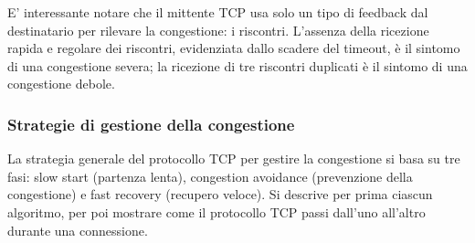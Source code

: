 E' interessante notare che il mittente TCP usa solo un tipo di feedback dal destinatario per rilevare la congestione: i riscontri. L'assenza della ricezione rapida e regolare dei riscontri, evidenziata dallo scadere del timeout, è il sintomo di una congestione severa; la ricezione di tre riscontri duplicati è il sintomo di una congestione debole.

\subsubsection{Strategie di gestione della congestione}
La strategia generale del protocollo TCP per gestire la congestione si basa su tre fasi: slow start (partenza lenta), congestion avoidance (prevenzione della congestione) e fast recovery (recupero veloce). Si descrive per prima ciascun algoritmo, per poi mostrare come il protocollo TCP passi dall'uno all'altro durante una connessione.

